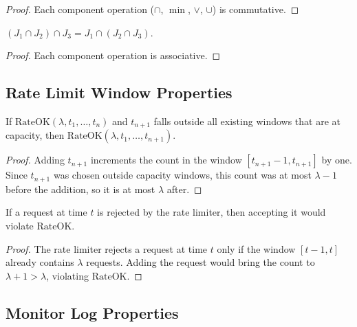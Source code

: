 \documentclass[11pt]{article}
\begin{document}
\begin{proof}
Each component operation ($\cap$, $\min$, $\vee$, $\cup$) is
commutative.
\end{proof}

\begin{lemma}
\label{lem:juris-assoc}
$(J_1 \cap J_2) \cap J_3 = J_1 \cap (J_2 \cap J_3)$.
\end{lemma}

\begin{proof}
Each component operation is associative.
\end{proof}

\subsection{Rate Limit Window Properties}
\label{app:rate}

\begin{lemma}
\label{lem:window-mono}
If $\mathrm{RateOK}(\lambda, t_1, \ldots, t_n)$ and $t_{n+1}$
falls outside all existing windows that are at capacity, then
$\mathrm{RateOK}(\lambda, t_1, \ldots, t_{n+1})$.
\end{lemma}

\begin{proof}
Adding $t_{n+1}$ increments the count in the window
$[t_{n+1}-1, t_{n+1}]$ by one.  Since $t_{n+1}$ was chosen
outside capacity windows, this count was at most $\lambda - 1$
before the addition, so it is at most $\lambda$ after.
\end{proof}

\begin{lemma}
\label{lem:rate-reject}
If a request at time $t$ is rejected by the rate limiter, then
accepting it would violate $\mathrm{RateOK}$.
\end{lemma}

\begin{proof}
The rate limiter rejects a request at time $t$ only if the
window $[t-1, t]$ already contains $\lambda$ requests.  Adding
the request would bring the count to $\lambda + 1 > \lambda$,
violating $\mathrm{RateOK}$.
\end{proof}

\subsection{Monitor Log Properties}
\label{app:monitor}
\end{document}

